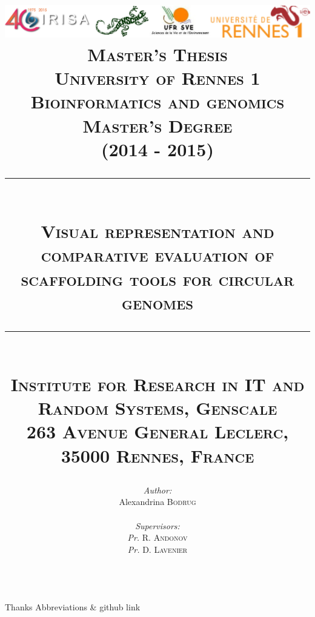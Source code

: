 \documentclass[11pt]{report}
\newcommand{\HRule}[1]{\rule{\linewidth}{#1}}
\begin{document}
\begin{titlepage}

\title{ \includegraphics[width=\textwidth, height=\textheight, keepaspectratio]{logos.jpg} \vspace*{1\baselineskip} \\
        \large \textbf{\textsc{Master's Thesis}} \\
        \normalsize \textsc{University of Rennes 1} \\
        \normalsize \textsc{Bioinformatics and genomics Master's Degree} \\
        \normalsize \textsc{(2014 - 2015)}
		\\
		\HRule{0.5pt} \\
		\large \textbf{\textsc{Visual representation and comparative evaluation of scaffolding tools for circular genomes}}
		\HRule{2pt} \\ [0.5cm]
		\footnotesize \textsc{Institute for Research in IT and Random Systems, Genscale \\
		263 Avenue General Leclerc, 35000 Rennes, France}
        }
\author{ \normalsize
	\begin{minipage}{0.4\textwidth}
	\begin{flushleft} 
	\emph{Author:}\\
	Alexandrina \textsc{Bodrug}
	\end{flushleft}
	\end{minipage}
	~
	\begin{minipage}{0.4\textwidth}
	\begin{flushright}
	\emph{Supervisors:} \\
	\textit{Pr.} R. \textsc{Andonov} \\
	\textit{Pr.} D. \textsc{Lavenier}
	\end{flushright}
	\end{minipage}\\[2cm]
	}
\end{titlepage}
\maketitle
\newpage
Thanks
\thispagestyle{empty}
\newpage
Abbreviations \& github link
\thispagestyle{empty}
\newpage
\tableofcontents
\thispagestyle{empty}
\end{document}
